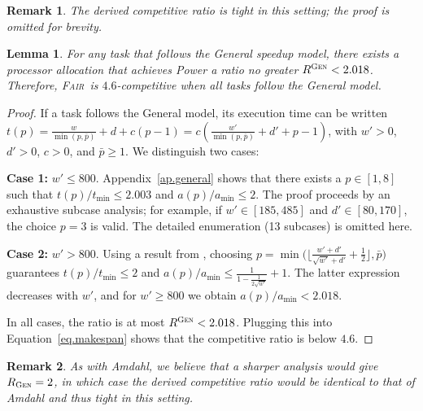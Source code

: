 \documentclass{article}
\newtheorem{lemma}{Lemma}
\newtheorem{remark}{Remark}
\newcommand\fair{\textsc{Fair}\xspace}
\newcommand\GEN{\textsc{Gen}\xspace}
\begin{document}
\begin{remark}
The derived competitive ratio is tight in this setting; the proof is omitted for brevity.
\end{remark}

\begin{lemma}\label{lem.general}
For any task that follows the General speedup model, there exists a processor allocation that achieves Power a ratio no greater $R^{\GEN}<2.018$. Therefore, \fair\ is $4.6$-competitive when all tasks follow the General model.
\end{lemma}

\begin{proof}
If a task follows the General model, its execution time can be written
$t(p) = \frac{w}{\min(p, \bar{p})} + d + c (p-1)
       = c\!\left( \frac{w'}{\min(p, \bar{p})} + d' + p - 1 \right)$,
with $w'>0$, $d'>0$, $c>0$, and $\bar{p}\ge 1$.
We distinguish two cases:

\textbf{Case 1:} $w' \le 800$.  
      Appendix~\ref{ap.general} shows that there exists a $p\in[1,8]$ such that
      $t(p)/t_{\min}\le 2.003$ and $a(p)/a_{\min}\le 2$.
      The proof proceeds by an exhaustive subcase analysis; for example,
      if $w' \in [185,485]$ and $d' \in [80,170]$, the choice $p=3$ is valid.
      The detailed enumeration (13 subcases) is omitted here.

 \textbf{Case 2:} $w' > 800$.  
      Using a result from \cite{TOPC24}, choosing
      $p=\min\!\bigl(\lfloor \tfrac{w'+d'}{\sqrt{w'}+d'} + \tfrac12\rfloor,\bar{p}\bigr)$
      guarantees $t(p)/t_{\min}\le 2$ and
      $a(p)/a_{\min}\le \frac{1}{1-\frac{1}{2\sqrt{w'}}}+1$.
      The latter expression decreases with $w'$, and for $w'\ge 800$ we obtain
      $a(p)/a_{\min}<2.018$.


In all cases, the ratio is at most $R^{\GEN}<2.018$.
Plugging this into Equation~\ref{eq.makespan} shows that the competitive
ratio is below $4.6$.
\end{proof}

\begin{remark}
As with Amdahl, we believe that a sharper analysis would give
$R_{\GEN}=2$, in which case the derived competitive ratio would be identical
to that of Amdahl and thus tight in this setting.
\end{remark}
\end{document}
